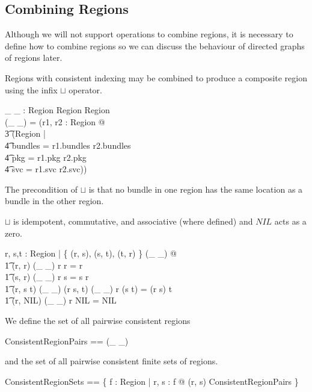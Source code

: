 \documentclass[a4paper,9pt,twoside]{article}
\begin{document}
\subsection{Combining Regions}

Although we will not support operations to combine regions, it is necessary to define how to combine
regions so we can discuss the behaviour of directed graphs of regions later.

Regions with consistent indexing may be combined to produce a composite region using the infix $\sqcup$ operator.
\begin{axdef}
 \_ \sqcup \_ : Region \cross Region \pfun Region \\
\where
 (\_ \sqcup \_) = (\lambda r1, r2 : Region @ \\
\t3 (\mu Region | \\
\t4 bundles = r1.bundles \cup r2.bundles \land \\
\t4 pkg = r1.pkg \cup r2.pkg \land \\
\t4 svc = r1.svc \cup r2.svc)) \\
\end{axdef}
The precondition of $\sqcup$ is that no bundle in one region has the same location as a bundle in the other region.

$\sqcup$ is idempotent, commutative, and associative (where defined) and $NIL$ acts as a zero.
\begin{argue}
  \shows \forall r, s,t : Region | \{ (r, s), (s, t), (t, r) \} \subseteq \dom(\_ \sqcup \_) @ \\
\t1 (r, r) \in \dom(\_ \sqcup \_) \land r \sqcup r = r \land \\
\t1 (s, r) \in \dom(\_ \sqcup \_) \land r \sqcup s = s \sqcup r \land \\
\t1 (r, s \sqcup t) \in \dom(\_ \sqcup \_) \land (r \sqcup s, t) \in \dom(\_ \sqcup \_) \land r \sqcup (s \sqcup t) = (r \sqcup s) \sqcup t \land \\
\t1 (r, NIL) \in \dom(\_ \sqcup \_) \land r \sqcup NIL = NIL \\
\end{argue}

We define the set of all pairwise consistent regions
\begin{zed}
  ConsistentRegionPairs == \dom(\_ \sqcup \_) \\
\end{zed}
and the set of all pairwise consistent finite sets of regions.
\begin{zed}
  ConsistentRegionSets == \{ f : \finset Region | \forall r, s : f @ (r, s) \in ConsistentRegionPairs \} \\
\end{zed}
\end{document}
